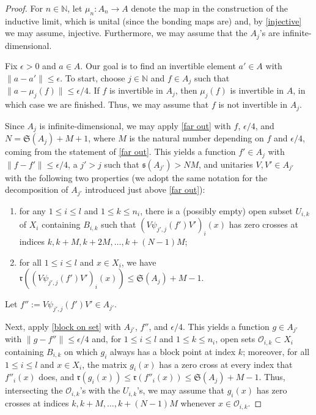 \documentclass[12pt]{amsart}
\numberwithin{equation}{section}
\theoremstyle{definition}
\theoremstyle{remark}
\newcommand{\NN}{\mathbb{N}}
\begin{document}
\begin{proof}
	For $n\in\NN$, let $\mu_{n}\colon A_{n}\to A$ denote the map in the construction of the inductive limit, which is unital (since the bonding maps are) and, by \autoref{injective} we may assume, injective. Furthermore, we may assume that the $A_{j}$'s are infinite-dimensional.
	
	Fix $\epsilon >0$ and $a\in A$. Our goal is to find an invertible element $a'\in A$ with $\|a-a'\|\leq\epsilon$. To start, choose $j\in\NN$ and $f\in A_{j}$ such that $\|a-\mu_{j}(f)\|\leq\epsilon/4$. If $f$ is invertible in $A_{j}$, then $\mu_{j}(f)$ is invertible in $A$, in which case we are finished. Thus, we may assume that $f$ is not invertible in $A_{j}$. 
	
	Since $A_{j}$ is infinite-dimensional, we may apply \autoref{far out} with $f$, $\epsilon/4$, and $N=\mathfrak{S}(A_{j})+M+1$, where $M$ is the natural number depending on $f$ and $\epsilon/4$, coming from the statement of \autoref{far out}. This yields a function $f'\in A_{j}$ with $\|f-f'\|\leq\epsilon/4$, a $j'>j$ such that $\mathfrak{s}(A_{j'})>NM$, and unitaries $V,V'\in A_{j'}$ with the following two properties (we adopt the same notation for the decomposition of $A_{j'}$ introduced just above \autoref{far out}):
	\begin{enumerate}
		\item for any $1\leq i\leq  l $ and $1\leq k\leq n_{i}$, there is a (possibly empty) open subset $U_{i,k}$ of $X_{i}$ containing $B_{i,k}$ such that $(V\psi_{j',j}(f')V')_{i}(x)$ has zero crosses at indices $k, k+M, k+2M,\ldots,k+(N-1)M$;
		\item for all $1\leq i\leq l $ and $x\in X_{i}$, we have $\mathfrak{r}((V\psi_{j',j}(f')V')_{i}(x))\leq \mathfrak{S}(A_{j})+M-1$.
	\end{enumerate}
	Let $f'':=V\psi_{j',j}(f')V'\in A_{j'}$. 
	
	Next, apply \autoref{block on set} with $A_{j'}$, $f''$, and $\epsilon/4$. This yields a function $g\in A_{j'}$ with $\|g-f''\|\leq \epsilon/4$ and, for $1\leq i\leq  l $ and $1\leq k\leq n_{i}$, open sets $\mathcal{O}_{i,k}\subset X_{i}$ containing $B_{i,k}$ on which $g_{i}$ always has a block point at index $k$; moreover, for all $1\leq i\leq l $ and $x\in X_{i}$, the matrix $g_{i}(x)$ has a zero cross at every index that $f''_{i}(x)$ does, and $\mathfrak{r}(g_{i}(x))\leq\mathfrak{r}(f''_{i}(x))\leq\mathfrak{S}(A_{j})+M-1$. Thus, intersecting the $\mathcal{O}_{i,k}$'s with the $U_{i,k}$'s, we may assume that $g_{i}(x)$ has zero crosses at indices $k,k+M,\ldots,k+(N-1)M$ whenever $x\in \mathcal{O}_{i,k}$. 
	

\end{proof}
\end{document}
